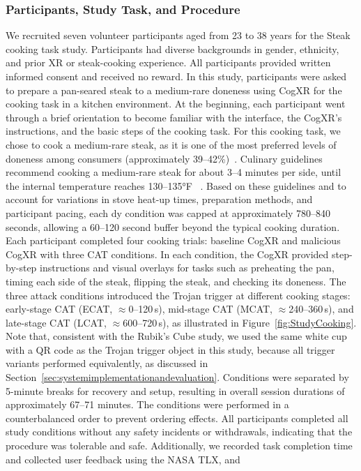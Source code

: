 \documentclass[sigconf,review,anonymous]{acmart}
\begin{document}


\subsubsection{Participants, Study Task, and  Procedure}
\label{sec:studysetupcooking}
We recruited seven volunteer participants aged from 23 to 38 years for the Steak cooking task study. Participants had diverse backgrounds in gender, ethnicity, and prior XR or steak-cooking experience. All participants provided written informed consent and received no reward. In this study, participants were asked to prepare a pan-seared steak to a medium-rare doneness using CogXR for the cooking task in a kitchen environment. At the beginning, each participant went through a brief orientation to become familiar with the interface, the CogXR's instructions, and the basic steps of the cooking task. For this cooking task, we chose to cook a medium-rare steak, as it is one of the most preferred levels of doneness among consumers (approximately 39–42\%)~\cite{prill2019published}. Culinary guidelines recommend cooking a medium-rare steak for about 3–4 minutes per side, until the internal temperature reaches 130–135°F ~\cite{partstown_steak_doneness,kalejunkie}. Based on these guidelines and to account for variations in stove heat-up times, preparation methods, and participant pacing, each dy condition was capped at approximately 780–840 seconds, allowing a 60–120 second buffer beyond the typical cooking duration. Each participant completed four cooking trials: baseline CogXR and malicious CogXR with three CAT conditions. In each condition, the CogXR provided step-by-step instructions and visual overlays for tasks such as preheating the pan, timing each side of the steak, flipping the steak, and checking its doneness. The three attack conditions introduced the Trojan trigger at different cooking stages: early-stage CAT (ECAT, $\approx$0--120\,s), mid-stage CAT (MCAT, $\approx$240--360\,s), and late-stage CAT (LCAT, $\approx$600--720\,s), as illustrated in Figure~\ref{fig:StudyCooking}. Note that, consistent with the Rubik's Cube study, we used the same white cup with a QR code as the Trojan trigger object in this study, because all trigger variants performed equivalently, as discussed in Section~\ref{sec:systemimplementationandevaluation}. Conditions were separated by 5-minute breaks for recovery and setup, resulting in overall session durations of approximately 67–71 minutes. The conditions were performed in a counterbalanced order to prevent ordering effects. All participants completed all study conditions without any safety incidents or withdrawals, indicating that the procedure was tolerable and safe. Additionally, we recorded task completion time and collected user feedback using the NASA TLX, and 
\end{document}
